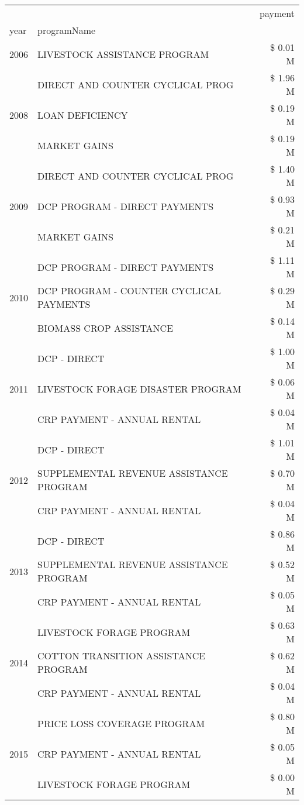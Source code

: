 \begin{tabular}{llr}
\toprule
 &  & payment \\
year & programName &  \\
\midrule
2006 & LIVESTOCK ASSISTANCE PROGRAM & \$ 0.01 M \\
\cline{1-3}
\multirow[t]{3}{*}{2008} & DIRECT AND COUNTER CYCLICAL PROG & \$ 1.96 M \\
 & LOAN DEFICIENCY & \$ 0.19 M \\
 & MARKET GAINS & \$ 0.19 M \\
\cline{1-3}
\multirow[t]{3}{*}{2009} & DIRECT AND COUNTER CYCLICAL PROG & \$ 1.40 M \\
 & DCP PROGRAM - DIRECT PAYMENTS & \$ 0.93 M \\
 & MARKET GAINS & \$ 0.21 M \\
\cline{1-3}
\multirow[t]{3}{*}{2010} & DCP PROGRAM - DIRECT PAYMENTS & \$ 1.11 M \\
 & DCP PROGRAM - COUNTER CYCLICAL PAYMENTS & \$ 0.29 M \\
 & BIOMASS CROP ASSISTANCE & \$ 0.14 M \\
\cline{1-3}
\multirow[t]{3}{*}{2011} & DCP - DIRECT & \$ 1.00 M \\
 & LIVESTOCK FORAGE DISASTER PROGRAM & \$ 0.06 M \\
 & CRP PAYMENT - ANNUAL RENTAL & \$ 0.04 M \\
\cline{1-3}
\multirow[t]{3}{*}{2012} & DCP - DIRECT & \$ 1.01 M \\
 & SUPPLEMENTAL REVENUE ASSISTANCE PROGRAM & \$ 0.70 M \\
 & CRP PAYMENT - ANNUAL RENTAL & \$ 0.04 M \\
\cline{1-3}
\multirow[t]{3}{*}{2013} & DCP - DIRECT & \$ 0.86 M \\
 & SUPPLEMENTAL REVENUE ASSISTANCE PROGRAM & \$ 0.52 M \\
 & CRP PAYMENT - ANNUAL RENTAL & \$ 0.05 M \\
\cline{1-3}
\multirow[t]{3}{*}{2014} & LIVESTOCK FORAGE PROGRAM & \$ 0.63 M \\
 & COTTON TRANSITION ASSISTANCE PROGRAM & \$ 0.62 M \\
 & CRP PAYMENT - ANNUAL RENTAL & \$ 0.04 M \\
\cline{1-3}
\multirow[t]{3}{*}{2015} & PRICE LOSS COVERAGE PROGRAM & \$ 0.80 M \\
 & CRP PAYMENT - ANNUAL RENTAL & \$ 0.05 M \\
 & LIVESTOCK FORAGE PROGRAM & \$ 0.00 M \\

\end{tabular}
